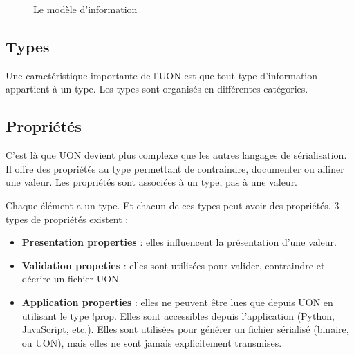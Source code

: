 \documentclass[
    iict, %
    il, %
]{heig-tb}
\begin{document}
\begin{figure}[!h]
    \begin{center}
    \end{center}
    \caption[Le modèle d'information]{\label{information-model}Le modèle d'information}
\end{figure}

\subsection{Types}
Une caractéristique importante de l'UON est que tout type d'information appartient à un type. Les types sont organisés en différentes catégories.

\subsection{Propriétés}\label{properties}
C'est là que UON devient plus complexe que les autres langages de sérialisation.
Il offre des propriétés au type permettant de contraindre, documenter ou affiner une valeur. Les propriétés sont associées à un type, pas à une valeur.

Chaque élément a un type. Et chacun de ces types peut avoir des propriétés.
3 types de propriétés existent :
\begin{itemize}
    \item \textbf{Presentation properties} : elles influencent la présentation d'une valeur.
    \item \textbf{Validation propeties} : elles sont utilisées pour valider, contraindre et décrire un fichier UON.
    \item \textbf{Application properties} : elles ne peuvent être lues que depuis UON en utilisant le type !prop. Elles sont accessibles depuis l'application (Python, JavaScript, etc.). Elles sont utilisées pour générer un fichier sérialisé (binaire, ou UON), mais elles ne sont jamais explicitement transmises.
\end{itemize}
\end{document}
